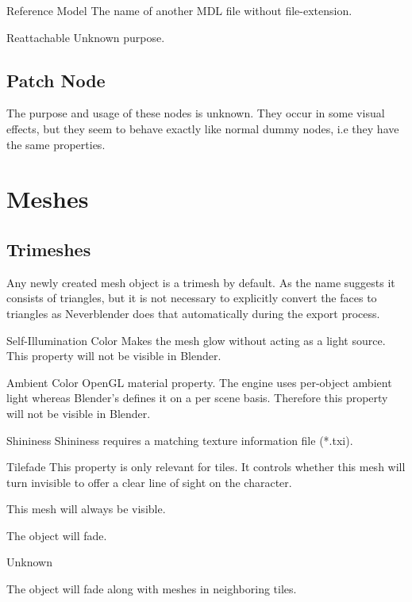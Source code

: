 \begin{propertyAurora}{Reference Model}
The name of another MDL file without file-extension.
\end{propertyAurora}

\begin{propertyAurora}{Reattachable}
Unknown purpose.
\end{propertyAurora}

\subsection{Patch Node}
The purpose and usage of these nodes is unknown. They occur in some visual effects, but
they seem to behave exactly like normal dummy nodes, i.e they have the same
properties.

\section{Meshes}

\subsection{Trimeshes}

Any newly created mesh object is a trimesh by default. As the name 
suggests it consists of triangles, but it is not necessary to explicitly 
convert the faces to triangles as Neverblender does that automatically 
during the export process.

\begin{propertyAurora}{Self-Illumination Color}
Makes the mesh glow without acting as a light source.
This property will not be visible in Blender.
\end{propertyAurora}

\begin{propertyAurora}{Ambient Color}
OpenGL material property. The engine uses per-object ambient light whereas Blender's 
defines it on a per scene basis. Therefore this property will not be visible in Blender.
\end{propertyAurora}

\begin{propertyAurora}{Shininess}
Shininess requires a matching texture information file (*.txi).
\end{propertyAurora}

\begin{propertyAurora}{Tilefade}
This property is only relevant for tiles. It controls whether this 
mesh will turn invisible to offer a clear line of sight on the character.
\begin{description}[leftmargin=6em,style=nextline]
    \item[None] This mesh will always be visible.
    \item[Fade] The object will fade.
    \item[Base] Unknown
    \item[Neighbor] The object will fade along with meshes in neighboring tiles.
\end{description}
\end{propertyAurora}

